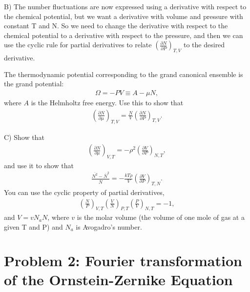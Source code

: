 \documentclass[paper=a4, fontsize=11pt]{scrartcl} %
\numberwithin{equation}{section} %
\numberwithin{figure}{section} %
\numberwithin{table}{section} %
\begin{document}
B) \hspace{.5cm}  The number fluctuations are now expressed using a derivative with respect to the chemical potential, 
but we want a derivative with volume and pressure with constant T and N. So we need to change the derivative with
respect to the chemical potential to a derivative with respect to the pressure, and then we can use the cyclic rule 
for partial
derivatives to relate $\left( \frac{\partial N}{\partial P}\right)_{T,V}$ to the desired derivative.

The thermodynamic potential corresponding to the grand canonical ensemble is the grand potential:
\begin{align*}
 \Omega = -PV \equiv A - \mu N,
\end{align*}
where $A$ is the Helmholtz free energy.
Use this to show that
\begin{align*}
 \left( \frac{\partial N}{\partial \mu} \right)_{T,V} = \frac{N}{V} \left( \frac{\partial N}{\partial P} \right)_{T,V}.
\end{align*}

C) \hspace{.5cm} Show that
\begin{align*}
 \left( \frac{\partial N}{\partial \mu} \right)_{V,T} = - \rho^2 \left( \frac{\partial V}{\partial P} \right)_{N,T},
\end{align*}
and use it to show that
\begin{align*}
 \frac{\overline{N^2} - \overline{N}^2}{\overline{N}} =
 - \frac{kT\rho}{V} \left(\frac{\partial V}{\partial P}\right)_{T,N}.
\end{align*}
You can use the cyclic property of partial derivatives,
\begin{align*}
 \left(\frac{N}{P} \right)_{V,T}  \left(\frac{V}{N} \right)_{P,T}  \left(\frac{P}{V} \right)_{N,T} = -1,
\end{align*}
and $V=v N_a N$, where $v$ is the molar volume (the volume of one mole of gas at a given T and P)
and $N_a$ is Avogadro's number.




\section*{Problem 2: Fourier transformation of the Ornstein-Zernike Equation}
\end{document}
